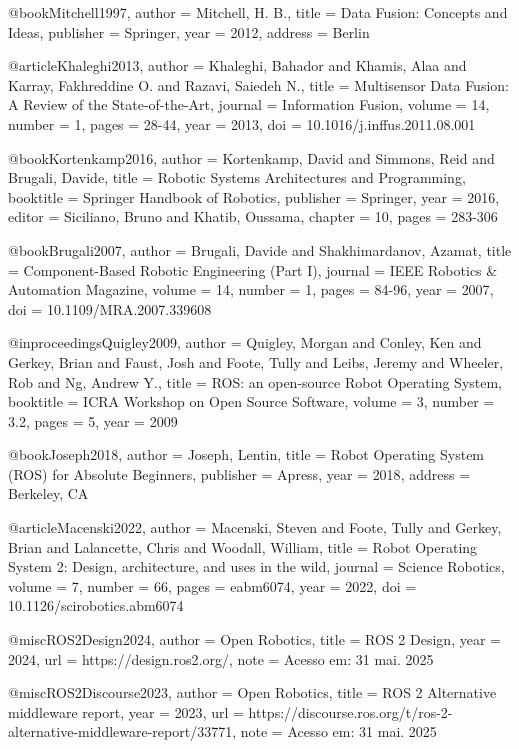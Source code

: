 @book{Mitchell1997,
  author = {Mitchell, H. B.},
  title = {Data Fusion: Concepts and Ideas},
  publisher = {Springer},
  year = {2012},
  address = {Berlin}
}

@article{Khaleghi2013,
  author = {Khaleghi, Bahador and Khamis, Alaa and Karray, Fakhreddine O. and Razavi, Saiedeh N.},
  title = {Multisensor Data Fusion: A Review of the State-of-the-Art},
  journal = {Information Fusion},
  volume = {14},
  number = {1},
  pages = {28-44},
  year = {2013},
  doi = {10.1016/j.inffus.2011.08.001}
}

@book{Kortenkamp2016,
  author = {Kortenkamp, David and Simmons, Reid and Brugali, Davide},
  title = {Robotic Systems Architectures and Programming},
  booktitle = {Springer Handbook of Robotics},
  publisher = {Springer},
  year = {2016},
  editor = {Siciliano, Bruno and Khatib, Oussama},
  chapter = {10},
  pages = {283-306}
}

@book{Brugali2007,
  author = {Brugali, Davide and Shakhimardanov, Azamat},
  title = {Component-Based Robotic Engineering (Part I)},
  journal = {IEEE Robotics \& Automation Magazine},
  volume = {14},
  number = {1},
  pages = {84-96},
  year = {2007},
  doi = {10.1109/MRA.2007.339608}
}

@inproceedings{Quigley2009,
  author = {Quigley, Morgan and Conley, Ken and Gerkey, Brian and Faust, Josh and Foote, Tully and Leibs, Jeremy and Wheeler, Rob and Ng, Andrew Y.},
  title = {ROS: an open-source Robot Operating System},
  booktitle = {ICRA Workshop on Open Source Software},
  volume = {3},
  number = {3.2},
  pages = {5},
  year = {2009}
}

@book{Joseph2018,
  author = {Joseph, Lentin},
  title = {Robot Operating System (ROS) for Absolute Beginners},
  publisher = {Apress},
  year = {2018},
  address = {Berkeley, CA}
}

@article{Macenski2022,
  author = {Macenski, Steven and Foote, Tully and Gerkey, Brian and Lalancette, Chris and Woodall, William},
  title = {Robot Operating System 2: Design, architecture, and uses in the wild},
  journal = {Science Robotics},
  volume = {7},
  number = {66},
  pages = {eabm6074},
  year = {2022},
  doi = {10.1126/scirobotics.abm6074}
}

@misc{ROS2Design2024,
  author = {Open Robotics},
  title = {ROS 2 Design},
  year = {2024},
  url = {https://design.ros2.org/},
  note = {Acesso em: 31 mai. 2025}
}

@misc{ROS2Discourse2023,
  author = {Open Robotics},
  title = {ROS 2 Alternative middleware report},
  year = {2023},
  url = {https://discourse.ros.org/t/ros-2-alternative-middleware-report/33771},
  note = {Acesso em: 31 mai. 2025}
}

